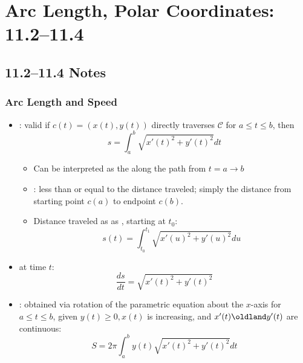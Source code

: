 \chapter{Arc Length, Polar Coordinates: 11.2--11.4}
\section{11.2--11.4 Notes}

\subsection{Arc Length and Speed}
\begin{itemize}
\item {}: valid if \( c(t) = (x(t), y(t))\)
  directly traverses \(\mathcal{C}\) for \(a \leq t \leq b\), then
  \[%
    s = \int_{a}^{b} \sqrt{x'(t)^2 + y'(t)^2} dt
  \]%
  \begin{itemize}
    \item Can be interpreted as the  along the
      path from \(t = a \to b\)
    \item {}: less than or equal to the distance traveled;
      simply the distance from starting point \(c(a)\) to endpoint \(c(b)\).
    \item Distance traveled as as , starting at \(t_0\):
      \[%
        s(t) = \int_{t_0}^{t_1}  \sqrt{x'(u)^2 + y'(u)^2} du
      \]%
  \end{itemize}

\item {} at time \(t\):
  \[%
    \frac{ds}{dt} = \sqrt{ x'(t)^2 +y'(t)^2}
  \]%

\item {}: obtained via rotation of the parametric equation
  about the \(x\)-axis for \(a \leq t \leq b\), given \(y(t) \geq 0, x(t)\)
  is increasing, and \(x'(t) \oldland y'(t)\) are continuous:
  \[%
    S = 2\pi \int_{a}^{b}  y(t) \sqrt{x'(t)^2 + y'(t)^2}  dt
  \]%
\end{itemize}

\newpage %

